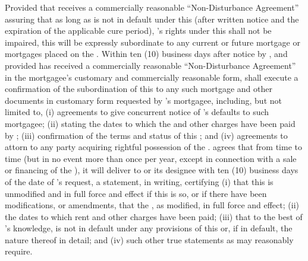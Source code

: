 Provided that \lessee receives a commercially reasonable ``Non-Disturbance Agreement'' assuring \lessee that as long as \lessee is not in default under this \lease (after written notice and the expiration of the applicable cure period), \lessee's rights under this \lease shall not be impaired, this \lease will be expressly subordinate to any current or future mortgage or mortgages placed on the \building. Within ten (10) business days after notice by \lessor, and provided \lessee has received a commercially reasonable ``Non-Disturbance Agreement'' in the mortgagee's customary and commercially reasonable form, \lessee shall execute a confirmation of the subordination of this \lease to any such mortgage and other documents in customary form requested by \lessor's mortgagee, including, but not limited to, (i) agreements to give concurrent notice of \lessor's defaults to such mortgagee; (ii) stating the dates to which the \monthlyRent and other charges have been paid by \lessee; (iii) confirmation of the terms and status of this \lease; and (iv) agreements to attorn to any party acquiring rightful possession of the \premises. \lessee agrees that from time to time (but in no event more than once per year, except in connection with a sale or financing of the \building), it will deliver to \lessor or its designee with ten (10) business days of the date of \lessor's request, a statement, in writing, certifying (i) that this \lease is unmodified and in full force and effect if this is so, or if there have been modifications, or amendments, that the \lease, as modified, in full force and effect; (ii) the dates to which rent and other charges have been paid; (iii) that to the best of \lessee's knowledge, \lessor is not in default under any provisions of this \lease or, if in default, the nature thereof in detail; and (iv) such other true statements as \lessor may reasonably require.

